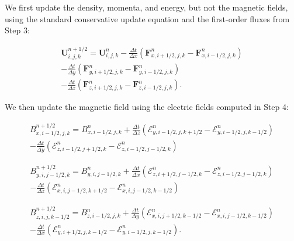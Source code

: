 \documentclass[modern, linenumbers]{aastex631}
\begin{document}
We first update the density, momenta, and energy, but not the magnetic fields, using the standard conservative update equation and the first-order fluxes from Step 3:

\begin{equation}
    \begin{aligned}
        \boldsymbol{U}^{n+1/2}_{i,j,k} = \boldsymbol{U}^{n}_{i,j,k}
        - \frac{\Delta t}{\Delta x} \left( \boldsymbol{F}^n_{x,i+1/2,j,k} - \boldsymbol{F}^n_{x,i-1/2,j,k} \right) \\
        - \frac{\Delta t}{\Delta y} \left( \boldsymbol{F}^n_{y,i+1/2,j,k} - \boldsymbol{F}^n_{y,i-1/2,j,k} \right) \\
        - \frac{\Delta t}{\Delta z} \left( \boldsymbol{F}^n_{z,i+1/2,j,k} - \boldsymbol{F}^n_{z,i-1/2,j,k} \right).
    \end{aligned}
\end{equation}

We then update the magnetic field using the electric fields computed in Step 4:

\begin{equation}
    \begin{aligned}
        B^{n+1/2}_{x,i-1/2,j,k} = B^{n}_{x,i-1/2,j,k}
        + \frac{\Delta t}{\Delta z} \left( \mathcal{E}^n_{y,i-1/2,j,k+1/2} - \mathcal{E}^n_{y,i-1/2,j,k-1/2} \right) \\
        - \frac{\Delta t}{\Delta y} \left( \mathcal{E}^n_{z,i-1/2,j+1/2,k} - \mathcal{E}^n_{z,i-1/2,j-1/2,k} \right)
    \end{aligned}
\end{equation}

\begin{equation}
    \begin{aligned}
        B^{n+1/2}_{y,i,j-1/2,k} = B^{n}_{y,i,j-1/2,k}
        + \frac{\Delta t}{\Delta x} \left( \mathcal{E}^n_{z,i+1/2,j-1/2,k} - \mathcal{E}^n_{z,i-1/2,j-1/2,k} \right) \\
        - \frac{\Delta t}{\Delta z} \left( \mathcal{E}^n_{x,i,j-1/2,k+1/2} - \mathcal{E}^n_{x,i,j-1/2,k-1/2} \right)
    \end{aligned}
\end{equation}

\begin{equation}
    \begin{aligned}
        B^{n+1/2}_{z,i,j,k-1/2} = B^{n}_{z,i-1/2,j,k}
        + \frac{\Delta t}{\Delta y} \left( \mathcal{E}^n_{x,i,j+1/2,k-1/2} - \mathcal{E}^n_{x,i,j-1/2,k-1/2} \right) \\
        - \frac{\Delta t}{\Delta x} \left( \mathcal{E}^n_{y,i+1/2,j,k-1/2} - \mathcal{E}^n_{y,i-1/2,j,k-1/2} \right).
    \end{aligned}
\end{equation}
\end{document}
